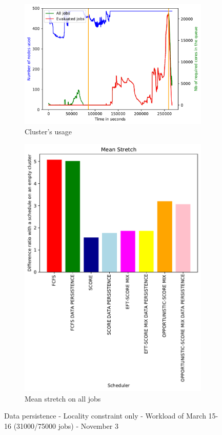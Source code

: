 \documentclass[a4paper]{article}
\begin{document}
\begin{figure}[H]\centering
\begin{subfigure}[b]{0.4\linewidth}\centering\includegraphics[width=1\linewidth]{MBSS/plot/2022-03-15->2022-03-16_V9271_Fcfs_Used_nodes_450_128_32_256_4_1024.pdf}\caption{Cluster's usage}\end{subfigure}
\begin{subfigure}[b]{0.4\linewidth}\centering\includegraphics[width=0.9\linewidth]{MBSS/plot/Results_Data_Persistence_2022-03-15->2022-03-16_V9271_Mean_Stretch_450_128_32_256_4_1024.pdf}\caption{Mean stretch on all jobs}\end{subfigure}
\caption{Data persistence - Locality constraint only - Workload of March 15-16 (31000/75000 jobs) - November 3}\end{figure}
\end{document}
